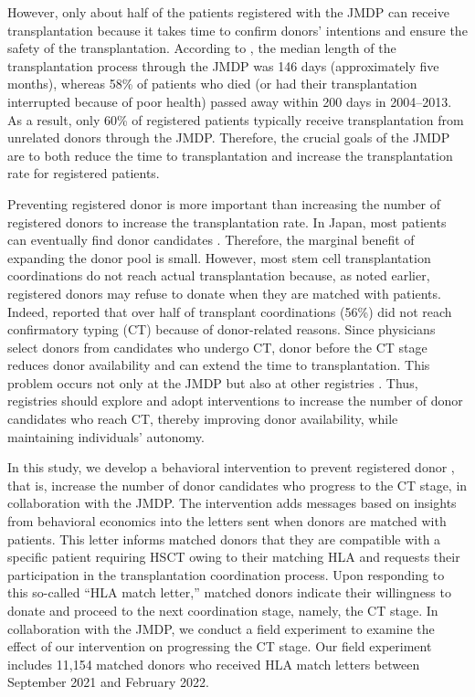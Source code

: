 \documentclass[12pt, a4paper]{article}
\newcommand{\revise}[1]{{\color{red}{#1}}}
\begin{document}
However, only about half of the patients registered with the JMDP can receive transplantation because it takes time to confirm donors' intentions and ensure the safety of the transplantation. According to \citet{Hirakawa2018}, the median length of the transplantation process through the JMDP was 146 days (approximately five months), whereas 58\% of patients who died (or had their transplantation interrupted because of poor health) passed away within 200 days in 2004--2013. As a result, only 60\% of registered patients typically receive transplantation from unrelated donors through the JMDP. Therefore, the crucial goals of the JMDP are to both reduce the time to transplantation and increase the transplantation rate for registered patients.

Preventing registered donor \revise{dropout} is more important than increasing the number of registered donors to increase the transplantation rate. In Japan, most patients can eventually find donor candidates \citep{Takanashi2016}. Therefore, the marginal benefit of expanding the donor pool is small. However, most stem cell transplantation coordinations do not reach actual transplantation because, as noted earlier, registered donors may refuse to donate when they are matched with patients. Indeed, \citet{Hirakawa2018} reported that over half of transplant coordinations (56\%) did not reach confirmatory typing (CT) because of donor-related reasons. Since physicians select donors from candidates who undergo CT, donor \revise{dropout} before the CT stage reduces donor availability and can extend the time to transplantation. This problem occurs not only at the JMDP but also at other registries \citep[for example,][]{Balassa2019, Hamed2023, Haylock2024}. Thus, registries should explore and adopt interventions to increase the number of donor candidates who reach CT, thereby improving donor availability, while maintaining individuals' autonomy.

In this study, we develop a behavioral intervention to prevent registered donor \revise{dropout}, that is, increase the number of donor candidates who progress to the CT stage, in collaboration with the JMDP. The intervention adds messages based on insights from behavioral economics into the letters sent when donors are matched with patients. This letter informs matched donors that they are compatible with a specific patient requiring HSCT owing to their matching HLA and requests their participation in the transplantation coordination process. Upon responding to this so-called ``HLA match letter,'' matched donors indicate their willingness to donate and proceed to the next coordination stage, namely, the CT stage. In collaboration with the JMDP, we conduct a field experiment to examine the effect of our intervention on progressing the CT stage. Our field experiment includes 11,154 matched donors who received HLA match letters between September 2021 and February 2022.
\end{document}
